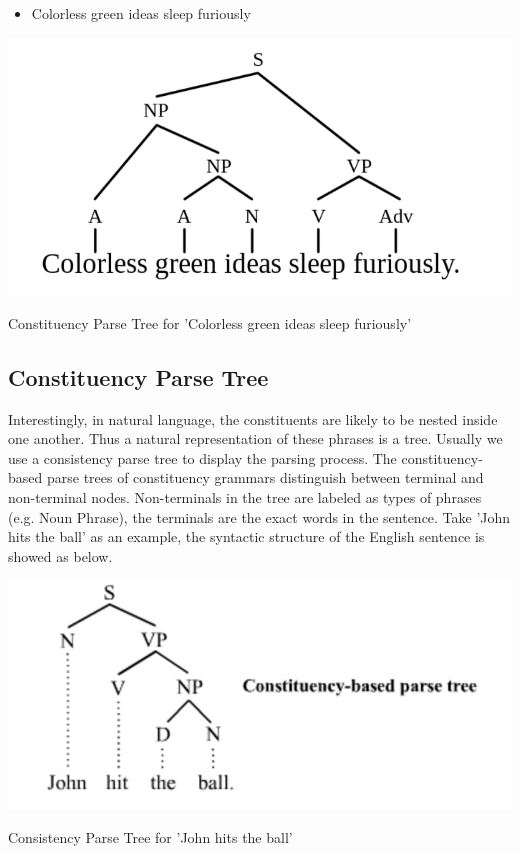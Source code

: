 \documentclass{tufte-handout}
\begin{document}
\begin{itemize}
\item Colorless green ideas sleep furiously
\end{itemize}

\begin{marginfigure}
	\centering
	\includegraphics[width=0.9\linewidth]{nonsense.png}
	\caption {Constituency Parse Tree for 'Colorless green ideas sleep furiously'}
	\label{fig:nonsense}
\end{marginfigure}


\subsection{Constituency Parse Tree}
Interestingly, in natural language, the constituents are likely to be nested inside one another. Thus a natural representation of these phrases is a tree. Usually we use a consistency parse tree to display the parsing process. The constituency-based parse trees of constituency grammars distinguish between terminal and non-terminal nodes. Non-terminals in the tree are labeled as types of phrases (e.g. Noun Phrase), the terminals are the exact words in the sentence. Take 'John hits the ball' as an example, the syntactic structure of the English sentence is showed as below.

\begin{marginfigure}
	\centering
	\includegraphics[width=0.9\linewidth]{ConstituencyParsing.png}
	\caption {Consistency Parse Tree for 'John hits the ball'}
	\label{fig:constParse}
\end{marginfigure}
\end{document}
